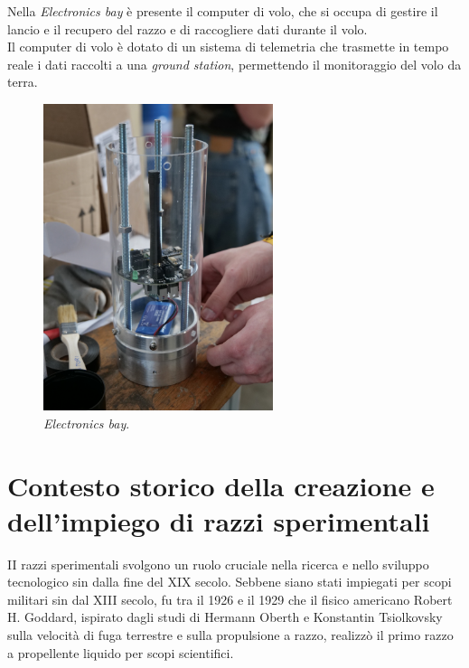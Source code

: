 \documentclass[12pt,a4paper,twoside]{book}
\begin{document}
Nella \emph{Electronics bay}
è presente il computer di volo, che si occupa di
gestire il lancio e il recupero del razzo e di raccogliere dati durante il volo. \\
Il computer di volo è dotato di un sistema di telemetria che trasmette in tempo
reale i dati raccolti a una \emph{ground station}, permettendo il monitoraggio
del volo da terra.

\begin{figure}[H]
    \centering
    \includegraphics[width=0.6\textwidth]{img/electronics-bay.jpg}
    \caption{\emph{Electronics bay}.}
    \label{fig:electronics-bay}
\end{figure}
\section{Contesto storico della creazione e dell'impiego di razzi sperimentali}
II razzi sperimentali svolgono un ruolo cruciale nella ricerca e nello sviluppo
tecnologico sin dalla fine del XIX secolo.
Sebbene siano stati impiegati per scopi militari sin dal XIII secolo, fu tra il
1926 e il 1929 che il fisico americano Robert H. Goddard, ispirato dagli studi
di Hermann Oberth e Konstantin Tsiolkovsky sulla velocità di fuga terrestre e
sulla propulsione a razzo, realizzò il primo razzo a propellente liquido per
scopi scientifici\cite{seibert2006history}.
\end{document}
